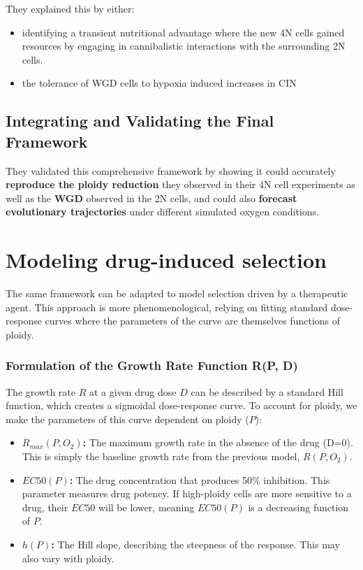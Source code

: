 \documentclass{article}
\begin{document}
They explained this by either:
\color{blue}
\begin{itemize}
    \item identifying a transient nutritional advantage where the new 4N cells gained resources by engaging in cannibalistic interactions with the surrounding 2N cells.
    \item the tolerance of WGD cells to hypoxia induced increases in CIN
\end{itemize}
\color{black}

\subsection{Integrating and Validating the Final Framework}
\color{blue}
 They validated this comprehensive framework by showing it could accurately \textbf{reproduce the ploidy reduction} they observed in their 4N cell experiments as well as the \textbf{WGD} observed in the 2N cells, and could also \textbf{forecast evolutionary trajectories} under different simulated oxygen conditions.
\color{black}



\section{Modeling drug-induced selection }
The same framework can be adapted to model selection driven by a therapeutic agent. This approach is more phenomenological, relying on fitting standard dose-response curves where the parameters of the curve are themselves functions of ploidy.

\subsubsection*{Formulation of the Growth Rate Function R(P, D)}

The growth rate $R$ at a given drug dose $D$ can be described by a standard Hill function, which creates a sigmoidal dose-response curve. To account for ploidy, we make the parameters of this curve dependent on ploidy ($P$):
\begin{itemize}
    \item \textbf{$R_{max}(P, O_2)$:} The maximum growth rate in the absence of the drug (D=0). This is simply the baseline growth rate from the previous model, $R(P, O_2)$.
    \item \textbf{$EC50(P)$:} The drug concentration that produces 50\% inhibition. This parameter measures drug potency. If high-ploidy cells are more sensitive to a drug, their $EC50$ will be lower, meaning $EC50(P)$ is a decreasing function of $P$.
    \item \textbf{$h(P)$:} The Hill slope, describing the steepness of the response. This may also vary with ploidy.
\end{itemize}
\end{document}
